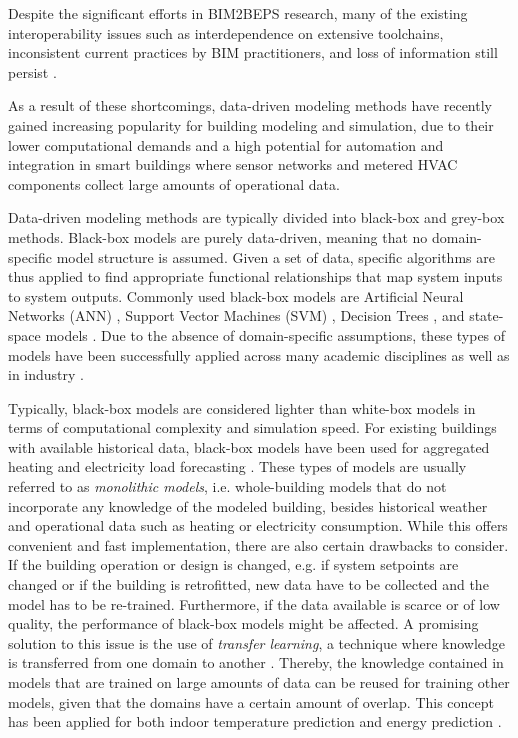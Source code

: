 Despite the significant efforts in BIM2BEPS research, many of the existing interoperability issues such as interdependence on extensive toolchains, inconsistent current practices by BIM practitioners, and loss of information still persist \cite{Andriamamonjy2018, CHONG20174114}. 

As a result of these shortcomings, data-driven modeling methods have recently gained increasing popularity for building modeling and simulation, due to their lower computational demands and a high potential for automation and integration in smart buildings where sensor networks and metered HVAC components collect large amounts of operational data. 

Data-driven modeling methods are typically divided into black-box and grey-box methods. Black-box models are purely data-driven, meaning that no domain-specific model structure is assumed. Given a set of data, specific algorithms are thus applied to find appropriate functional relationships that map system inputs to system outputs. Commonly used black-box models are Artificial Neural Networks (ANN) \cite{mtibaa2020a, fang2021a}, Support Vector Machines (SVM) \cite{b2005a}, Decision Trees \cite{yu2010a}, and state-space models \cite{ROYER201410850}. Due to the absence of domain-specific assumptions, these types of models have been successfully applied across many academic disciplines as well as in industry \cite{Shinde2018, ABIODUN2018e00938}. 

Typically, black-box models are considered lighter than white-box models in terms of computational complexity and simulation speed. For existing buildings with available historical data, black-box models have been used for aggregated heating and electricity load forecasting \cite{idowu2016a, guo2018a, pallonetto2022a}. These types of models are usually referred to as \textit{monolithic models}, i.e. whole-building models that do not incorporate any knowledge of the modeled building, besides historical weather and operational data such as heating or electricity consumption. While this offers convenient and fast implementation, there are also certain drawbacks to consider. If the building operation or design is changed, e.g. if system setpoints are changed or if the building is retrofitted, new data have to be collected and the model has to be re-trained. Furthermore, if the data available is scarce or of low quality, the performance of black-box models might be affected. A promising solution to this issue is the use of \textit{transfer learning}, a technique where knowledge is transferred from one domain to another \cite{PINTO2022100084}. Thereby, the knowledge contained in models that are trained on large amounts of data can be reused for training other models, given that the domains have a certain amount of overlap. This concept has been applied for both indoor temperature prediction \cite{Zhanhong2019} and energy prediction \cite{FANG2021119208}. 

